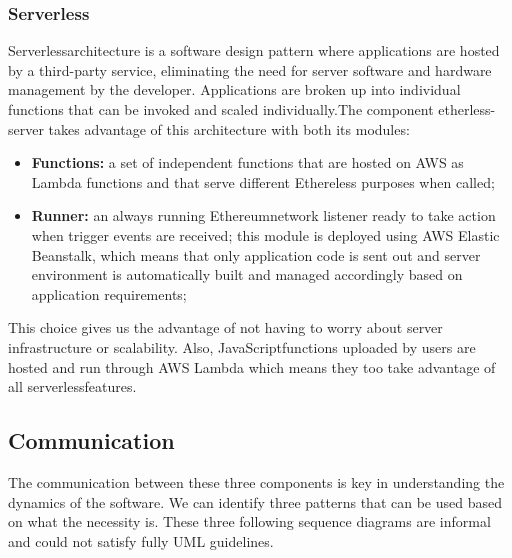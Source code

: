 \subsubsection{Serverless}
Serverless\glo architecture is a software design pattern where applications are hosted by a third-party service, eliminating the need for server software and hardware management by the developer. Applications are broken up into individual functions that can be invoked and scaled individually.\newline\newline The component etherless-server takes advantage of this architecture with both its modules:
\begin{itemize}
	\item \textbf{Functions:} a set of independent functions that are hosted on AWS as Lambda functions and that serve different Ethereless purposes when called;
	\item \textbf{Runner:} an always running Ethereum\glo network listener ready to take action when trigger events are received; this module is deployed using AWS Elastic Beanstalk, which means that only application code is sent out and server environment is automatically built and managed accordingly based on application requirements;
\end{itemize}
This choice gives us the advantage of not having to worry about server infrastructure or scalability.
Also, JavaScript\glo functions uploaded by users are hosted and run through AWS Lambda which means they too take advantage of all serverless\glo features.
\newpage
\subsection{Communication}
The communication between these three components is key in understanding the dynamics of the software. We can identify three patterns that can be used based on what the necessity is.
These three following sequence diagrams are informal and could not satisfy fully UML guidelines.
